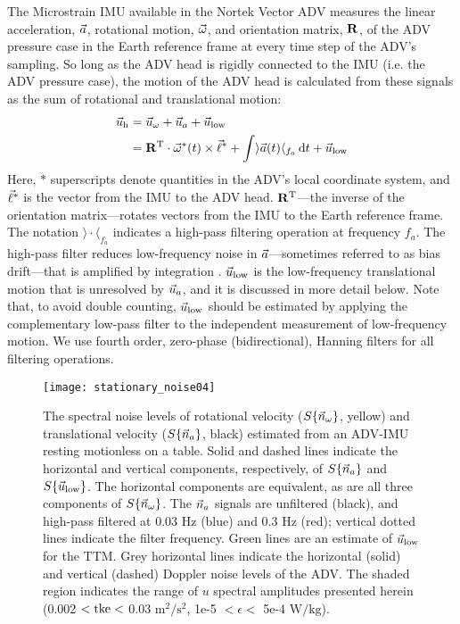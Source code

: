 The Microstrain IMU available in the Nortek Vector ADV measures the linear acceleration, ${\vec{a}}$, rotational motion, $\vec{\omega}$, and orientation matrix, $\mathbf{R}$, of the ADV pressure case in the Earth reference frame at every time step of the ADV's sampling. So long as the ADV head is rigidly connected to the IMU (i.e. the ADV pressure case), the motion of the ADV head is calculated from these signals as the sum of rotational and translational motion:
\begin{align}
  \label{eqn:uhead}
\begin{split}
  \vec{u}_\mathrm{h} & = \vec{u}_\omega + \vec{u}_a + \vec{u}_\mathrm{low} \\
      & = \mathbf{R}^\mathrm{T} \cdot \vec{\omega}^*(t)\times\vec{\ell}^* + \int \rangle {\vec{a}}(t)\langle_{f_{a}} \,\mathrm{d}t + \vec{u}_\mathrm{low}
\end{split}
\end{align}
Here, $*$ superscripts denote quantities in the ADV's local coordinate system, and $\vec{\ell}^*$ is the vector from the IMU to the ADV head. $\mathbf{R}^\mathrm{T}$---the inverse of the orientation matrix---rotates vectors from the IMU to the Earth reference frame. The notation $\rangle \cdot \langle _{f_a}$ indicates a high-pass filtering operation at frequency $f_a$. The high-pass filter reduces low-frequency noise in ${\vec{a}}$---sometimes referred to as bias drift---that is amplified by integration \cite[]{Barshan+Whyte1995, Bevly2004, Gulmammadov2009}. $\vec{u}_\mathrm{low}$ is the low-frequency translational motion that is unresolved by $\vec{u}_a$, and it is discussed in more detail below. Note that, to avoid double counting, $\vec{u}_\mathrm{low}$ should be estimated by applying the complementary low-pass filter to the independent measurement of low-frequency motion. We use fourth order, zero-phase (bidirectional), Hanning filters for all filtering operations.

\begin{figure}
  \centering
  \texttt{[image: stationary\_noise04]}
  \caption{The spectral noise levels of rotational velocity ($S\{\vec{n}_{\omega}\}$, yellow) and translational velocity ($S\{\vec{n}_{a}\}$, black) estimated from an ADV-IMU resting motionless on a table. Solid and dashed lines indicate the horizontal and vertical components, respectively, of $S\{\vec{n}_{a}\}$ and $S\{\vec{u}_\mathrm{low}\}$. The horizontal components are equivalent, as are all three components of $S\{\vec{n}_{\omega}\}$. The $\vec{n}_{a}$ signals are unfiltered (black), and high-pass filtered at 0.03 Hz (blue) and 0.3 Hz (red); vertical dotted lines indicate the filter frequency.  Green lines are an estimate of $\vec{u}_\mathrm{low}$ for the TTM. Grey horizontal lines indicate the horizontal (solid) and vertical (dashed) Doppler noise levels of the ADV. The shaded region indicates the range of $u$ spectral amplitudes presented herein (0.002 $< \mathrm{tke} <$ 0.03 $\mathrm{m^2/s^2}$, 1e-5 $< \epsilon <$ 5e-4 $\mathrm{W/kg}$).}
  \label{fig:stnoise}
\end{figure}

